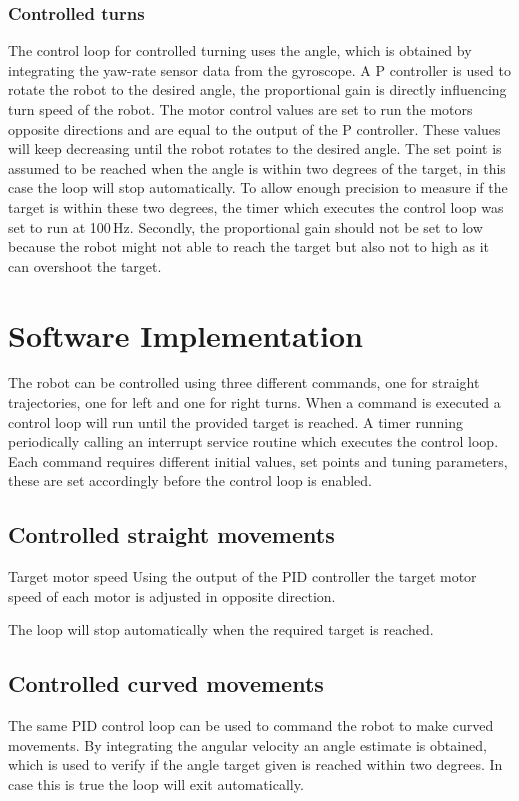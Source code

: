\subsubsection{Controlled turns}

The control loop for controlled turning uses the angle, which is obtained by integrating the yaw-rate sensor data from the gyroscope.
A P controller is used to rotate the robot to the desired angle, the proportional gain is directly influencing turn speed of the robot.
The motor control values are set to run the motors opposite directions and are equal to the output of the P controller.
These values will keep decreasing until the robot rotates to the desired angle.
The set point is assumed to be reached when the angle is within two degrees of the target, in this case the loop will stop automatically.
To allow enough precision to measure if the target is within these two degrees, the timer which executes the control loop was set to run at 100\,Hz.
Secondly, the proportional gain should not be set to low because the robot might not able to reach the target but also not to high as it can overshoot the target.

\section{Software Implementation}

The robot can be controlled using three different commands, one for straight trajectories, one for left and one for right turns.
When a command is executed a control loop will run until the provided target is reached.
A timer running periodically calling an interrupt service routine which executes the control loop.   
Each command requires different initial values, set points and tuning parameters, these are set accordingly before the control loop is enabled.

\subsection{Controlled straight movements}

Target motor speed 
Using the output of the PID controller the target motor speed of each motor is adjusted in opposite direction.

The loop will stop automatically when the required target is reached.

\subsection{Controlled curved movements}
The same PID control loop can be used to command the robot to make curved movements.
By integrating the angular velocity an angle estimate is obtained, which is used to verify if the angle target given is reached within two degrees.
In case this is true the loop will exit automatically.


